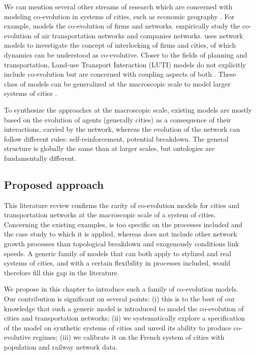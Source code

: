 \documentclass[11pt]{article}
\begin{document}
We can mention several other streams of research which are concerned with modeling co-evolution in systems of cities, such as economic geography \citep{schamp201020}. For example, \cite{doi:10.1080/00343400802662658} models the co-evolution of firms and networks. \cite{liu2013exploring} empirically study the co-evolution of air transportation networks and companies networks. \cite{neal2012structural} uses network models to investigate the concept of interlocking of firms and cities, of which dynamics can be understood as co-evolutive. Closer to the fields of planning and transportation, Land-use Transport Interaction (LUTI) models do not explicitly include co-evolution but are concerned with coupling aspects of both \citep{wegener2004land}. These class of models can be generalized at the macroscopic scale to model larger systems of cities \citep{russo2012unifying}.

To synthesize the approaches at the macroscopic scale, existing models are mostly based on the evolution of agents (generally cities) as a consequence of their interactions, carried by the network, whereas the evolution of the network can follow different rules: self-reinforcement, potential breakdown. The general structure is globally the same than at larger scales, but ontologies are fundamentally different.



\subsection{Proposed approach}

This literature review confirms the rarity of co-evolution models for cities and transportation networks at the macroscopic scale of a system of cities. Concerning the existing examples, \cite{baptistemodeling} is too specific on the processes included and the case study to which it is applied, whereas \cite{schmitt2014modelisation} does not include other network growth processes than topological breakdown and exogenously conditions link speeds. A generic family of models that can both apply to stylized and real systems of cities, and with a certain flexibility in processes included, would therefore fill this gap in the literature.

We propose in this chapter to introduce such a family of co-evolution models. Our contribution is significant on several points: (i) this is to the best of our knowledge that such a generic model is introduced to model the co-evolution of cities and transportation networks; (ii) we systematically explore a specification of the model on synthetic systems of cities and unveil its ability to produce co-evolutive regimes; (iii) we calibrate it on the French system of cities with population and railway network data.
\end{document}
